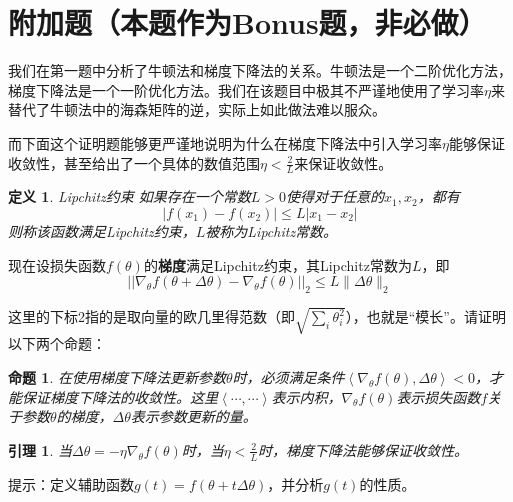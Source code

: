 \documentclass[12pt]{ctexart}
\newtheorem{lemma}[theorem]{\indent 引理}
\newtheorem{proposition}[theorem]{\indent 命题}
\newtheorem{definition}{\indent 定义}
\begin{document}
\section{附加题（本题作为Bonus题，非必做）}

我们在第一题中分析了牛顿法和梯度下降法的关系。牛顿法是一个二阶优化方法，梯度下降法是一个一阶优化方法。我们在该题目中极其不严谨地使用了学习率$\eta$来替代了牛顿法中的海森矩阵的逆，实际上如此做法难以服众。

而下面这个证明题能够更严谨地说明为什么在梯度下降法中引入学习率$\eta$能够保证收敛性，甚至给出了一个具体的数值范围$\eta < \frac{2}{L}$来保证收敛性。

\begin{definition}{Lipchitz约束}
如果存在一个常数$L > 0$使得对于任意的$x_1, x_2$，都有
\[|f(x_1) - f(x_2)| \leq L |x_1 - x_2|\]
则称该函数满足Lipchitz约束，$L$被称为Lipchitz常数。
\end{definition}

现在设损失函数$f(\theta)$的\textbf{梯度}满足Lipchitz约束，其Lipchitz常数为$L$，即
\[\left|\left|\nabla_\theta f(\theta + \Delta \theta) - \nabla_\theta f(\theta)\right|\right|_2 \leqslant L \|\Delta \theta\|_2\]

这里的下标2指的是取向量的欧几里得范数（即$\sqrt{\sum_i \theta_i^2}$），也就是“模长”。请证明以下两个命题：

\begin{proposition}
    在使用梯度下降法更新参数$\theta$时，必须满足条件$\left\langle \nabla_\theta f(\theta), \Delta \theta \right\rangle < 0$，才能保证梯度下降法的收敛性。这里$\left\langle \cdots, \cdots \right\rangle$表示内积，$\nabla_\theta f(\theta)$表示损失函数$f$关于参数$\theta$的梯度，$\Delta \theta$表示参数更新的量。
\end{proposition}

\begin{lemma}
    当$\Delta \theta = -\eta \nabla_\theta f(\theta)$时，当$\eta < \frac{2}{L}$时，梯度下降法能够保证收敛性。
\end{lemma}

提示：定义辅助函数$g(t) = f(\theta + t \Delta \theta)$，并分析$g(t)$的性质。
\end{document}
